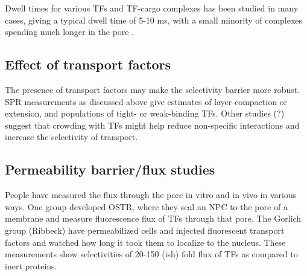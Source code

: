 Dwell times for various TFs and TF-cargo complexes has been studied in many cases, giving a typical dwell time of 5-10 ms, with a small minority of complexes spending much longer in the pore \cite{tu11}.

%
\subsection{Effect of transport factors}
The presence of transport factors may make the selectivity barrier more robust.  SPR measurements as discussed above give estimates of layer compaction or extension, and populations of tight- or weak-binding TFs.  Other studies (?) suggest that crowding with TFs might help reduce non-specific interactions and increase the selectivity of transport.
\subsection{Permeability barrier/flux studies}
People have measured the flux through the pore in vitro and in vivo in various ways.  One group developed OSTR, where they seal an NPC to the pore of a membrane and measure fluorescence flux of TFs through that pore.  The Gorlich group (Ribbeck) have permeabilized cells and injected fluorescent transport factors and watched how long it took them to localize to the nucleus.  These measurements show selectivities of 20-150 (ish) fold flux of TFs as compared to inert proteins.



